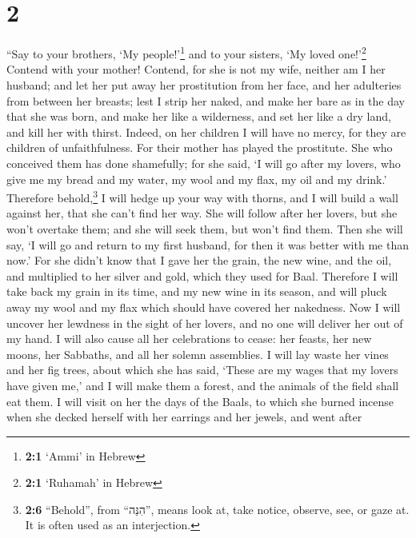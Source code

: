 \hypertarget{section-1}{%
\section{2}\label{section-1}}

 ``Say to your brothers, `My people!'\footnote{\textbf{2:1}
  `Ammi' in Hebrew} and to your sisters, `My loved one!'\footnote{\textbf{2:1}
  `Ruhamah' in Hebrew}  Contend with your mother! Contend,
for she is not my wife, neither am I her husband; and let her put away
her prostitution from her face, and her adulteries from between her
breasts;  lest I strip her naked, and make her bare as in
the day that she was born, and make her like a wilderness, and set her
like a dry land, and kill her with thirst.  Indeed, on her
children I will have no mercy, for they are children of unfaithfulness.
 For their mother has played the prostitute. She who
conceived them has done shamefully; for she said, `I will go after my
lovers, who give me my bread and my water, my wool and my flax, my oil
and my drink.'  Therefore behold,\footnote{\textbf{2:6}
  ``Behold'', from ``הִנֵּה'', means look at, take notice, observe, see,
  or gaze at. It is often used as an interjection.} I will hedge up your
way with thorns, and I will build a wall against her, that she can't
find her way.  She will follow after her lovers, but she
won't overtake them; and she will seek them, but won't find them. Then
she will say, `I will go and return to my first husband, for then it was
better with me than now.'  For she didn't know that I gave
her the grain, the new wine, and the oil, and multiplied to her silver
and gold, which they used for Baal.  Therefore I will take
back my grain in its time, and my new wine in its season, and will pluck
away my wool and my flax which should have covered her nakedness.
 Now I will uncover her lewdness in the sight of her
lovers, and no one will deliver her out of my hand.  I
will also cause all her celebrations to cease: her feasts, her new
moons, her Sabbaths, and all her solemn assemblies.  I
will lay waste her vines and her fig trees, about which she has said,
`These are my wages that my lovers have given me,' and I will make them
a forest, and the animals of the field shall eat them.  I
will visit on her the days of the Baals, to which she burned incense
when she decked herself with her earrings and her jewels, and went after
